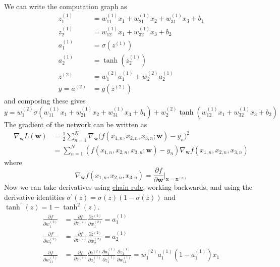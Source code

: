   \begin{solution}
    We can write the computation graph as 
    \begin{align} 
      z_1^{(1)} & = w_{11}^{(1)} x_1 + w_{21}^{(1)} x_2 + w_{31}^{(1)} x_3 + b_1 \\
      z_2^{(1)} & = w_{12}^{(1)} x_1 + w_{32}^{(1)} x_3 + b_2 \\
      a_1^{(1)} & = \sigma(z^{(1)})\\
      a_2^{(1)} & = \tanh(z_2^{(1)}) \\
      z^{(2)} & = w_{1}^{(2)} a_1^{(1)} + w_2^{(2)} a_2^{(1)} \\
      y = a^{(2)} & = g(z^{(2)})
    \end{align}
    and composing these gives 
    \begin{equation}
      y = w_1^{(2)} \sigma(w_{11}^{(1)} x_1  + w_{21}^{(1)} x_2 + w_{31}^{(1)} x_3 + b_1) + w_2^{(2)} \tanh(w_{12}^{(1)} x_1 + w_{32}^{(1)} x_3 + b_2)
    \end{equation}
    The gradient of the network can be written as 
    \begin{align}
      \nabla_\mathbf{w} L(\mathbf{w}) & = \frac{1}{2} \sum_{n=1}^N \nabla_\mathbf{w} \big( f(x_{1, n}, x_{2, n}, x_{3, n}; \mathbf{w}) - y_n \big)^2 \\
      & = \sum_{n=1}^N (f(x_{1, n}, x_{2, n}, x_{3, n}; \mathbf{w}) - y_n) \nabla_\mathbf{w} f(x_{1, n}, x_{2, n}, x_{3, n})
    \end{align}
    where 
    \begin{equation}
      \nabla_\mathbf{w} f(x_{1, n}, x_{2, n}, x_{3, n}) = \frac{\partial f}{\partial \mathbf{w}} \bigg|_{\mathbf{x} = \mathbf{x}^{(n)}}
    \end{equation}
    Now we can take derivatives using \hyperref[mv-thm:chain-rule]{chain rule}, working backwards, and using the derivative identities $\sigma^\prime (z)  = \sigma(z) (1 - \sigma(z))$ and $\tanh^\prime (z) = 1 - \tanh^2 (z)$. 
    \begin{align}
        \frac{\partial f}{\partial w_1^{(2)}} & = \frac{\partial f}{\partial z^{(2)}} \frac{\partial z^{(2)}}{\partial w_1^{(2)}} = a_1^{(1)} \\
        \frac{\partial f}{\partial w_2^{(2)}} & = \frac{\partial f}{\partial z^{(2)}} \frac{\partial z^{(2)}}{\partial w_2^{(2)}} = a_2^{(1)} \\ 
        \frac{\partial f}{\partial w_{11}^{(1)}} & = \frac{\partial f}{\partial z^{(2)}} \frac{\partial z^{(2)}}{\partial a^{(1)}_1} \frac{\partial a^{(1)}_1}{\partial z_1^{(1)}} \frac{\partial z_1^{(1)}}{\partial w_{11}^{(1)}} = w_1^{(2)} a_1^{(1)} (1 - a_1^{(1)}) x_1\\

\end{align}
\end{solution}
